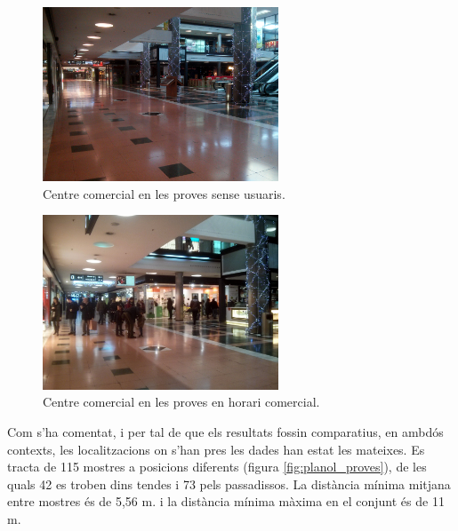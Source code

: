\begin{figure}[ht]
\begin{center}
\includegraphics[width=7cm]{imatges/foto_buit.jpg}
\caption{Centre comercial en les proves sense usuaris.}
\label{fig:foto_buit}
\end{center}
\end{figure}

\begin{figure}[ht]
\begin{center}
\includegraphics[width=7cm]{imatges/foto_ple.jpg}
\caption{Centre comercial en les proves en horari comercial.}
\label{fig:foto_ple}
\end{center}
\end{figure}

Com s'ha comentat, i per tal de que els resultats fossin comparatius, en ambdós contexts, les localitzacions on s'han pres les dades han estat les mateixes. Es tracta de 115 mostres a posicions diferents (figura \ref{fig:planol_proves}), de les quals 42 es troben dins tendes i 73 pels passadissos. La distància mínima mitjana entre mostres és de 5,56 m. i la distància mínima màxima en el conjunt és de 11 m.

